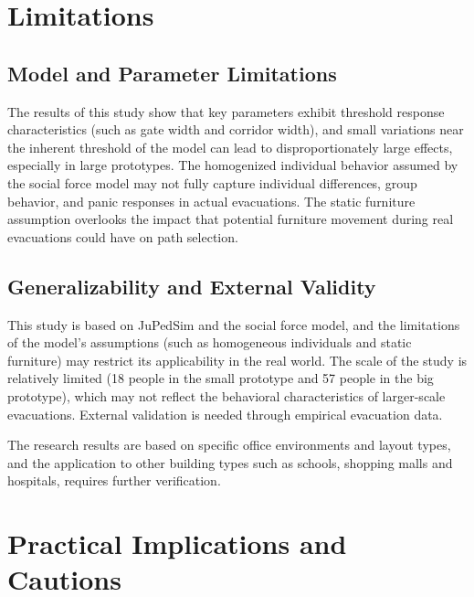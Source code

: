 \section{Limitations}

\subsection{Model and Parameter Limitations}

The results of this study show that key parameters exhibit threshold response characteristics (such as gate width and corridor width), and small variations near the inherent threshold of the model can lead to disproportionately large effects, especially in large prototypes. The homogenized individual behavior assumed by the social force model may not fully capture individual differences, group behavior, and panic responses in actual evacuations. The static furniture assumption overlooks the impact that potential furniture movement during real evacuations could have on path selection.

\subsection{Generalizability and External Validity}

This study is based on JuPedSim and the social force model, and the limitations of the model's assumptions (such as homogeneous individuals and static furniture) may restrict its applicability in the real world. The scale of the study is relatively limited (18 people in the small prototype and 57 people in the big prototype), which may not reflect the behavioral characteristics of larger-scale evacuations. External validation is needed through empirical evacuation data.

The research results are based on specific office environments and layout types, and the application to other building types such as schools, shopping malls and hospitals, requires further verification.

\section{Practical Implications and Cautions}

